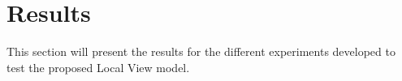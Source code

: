 \section{Results} \label{sec:local_view_results}
This section will present the results for the different experiments developed to test the proposed Local View model.